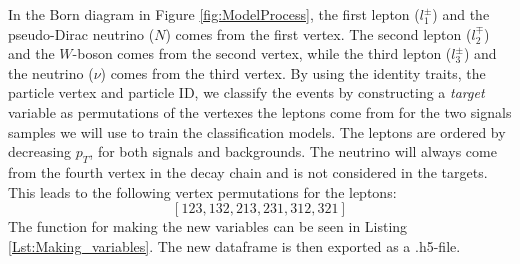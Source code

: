 \documentclass[a4paper, american, 12pt]{report}
\begin{document}
	In the Born diagram in Figure \ref{fig:ModelProcess}, the first lepton ($l_1^{\pm}$) and the pseudo-Dirac neutrino ($N$) comes from the first vertex. The second lepton ($l_2^{\mp}$) and the $W$-boson comes from the second vertex, while the third lepton ($l_3^{\pm}$) and the neutrino ($\nu$) comes from the third vertex. By using the identity traits, the particle vertex and particle ID, we classify the events by constructing a \textit{target} variable as permutations of the vertexes the leptons come from for the two signals samples we will use to train the classification models. The leptons are ordered by decreasing $p_T$, for both signals and backgrounds. The neutrino will always come from the fourth vertex in the decay chain and is not considered in the targets. This leads to the following vertex permutations for the leptons: 
	\begin{equation}
		\label{eq:Permutations}
		[123, 132, 213, 231, 312, 321]
	\end{equation}
	The function for making the new variables can be seen in Listing \ref{Lst:Making_variables}. The new dataframe is then exported as a .h5-file. 
\end{document}
